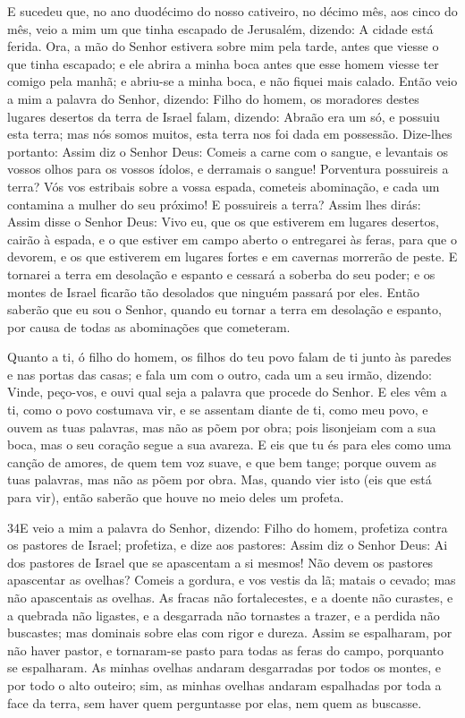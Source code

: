 E sucedeu que, no ano duodécimo do nosso cativeiro, no décimo
mês, aos cinco do mês, veio a mim um que tinha escapado de
Jerusalém, dizendo: A cidade está ferida. Ora, a mão do
Senhor estivera sobre mim pela tarde, antes que viesse o que tinha
escapado; e ele abrira a minha boca antes que esse homem viesse ter
comigo pela manhã; e abriu-se a minha boca, e não fiquei mais
calado. Então veio a mim a palavra do Senhor, dizendo:
Filho do homem, os moradores destes lugares desertos da terra
de Israel falam, dizendo: Abraão era um só, e possuiu esta terra;
mas nós somos muitos, esta terra nos foi dada em possessão.
Dize-lhes portanto: Assim diz o Senhor Deus: Comeis a carne
com o sangue, e levantais os vossos olhos para os vossos ídolos, e
derramais o sangue! Porventura possuireis a terra? Vós vos
estribais sobre a vossa espada, cometeis abominação, e cada um
contamina a mulher do seu próximo! E possuireis a terra?
Assim lhes dirás: Assim disse o Senhor Deus: Vivo eu, que os
que estiverem em lugares desertos, cairão à espada, e o que estiver
em campo aberto o entregarei às feras, para que o devorem, e os que
estiverem em lugares fortes e em cavernas morrerão de peste.
E tornarei a terra em desolação e espanto e cessará a soberba
do seu poder; e os montes de Israel ficarão tão desolados que
ninguém passará por eles. Então saberão que eu sou o Senhor,
quando eu tornar a terra em desolação e espanto, por causa de todas
as abominações que cometeram.

Quanto a ti, ó filho do homem, os filhos do teu povo falam de ti
junto às paredes e nas portas das casas; e fala um com o outro, cada
um a seu irmão, dizendo: Vinde, peço-vos, e ouvi qual seja a palavra
que procede do Senhor. E eles vêm a ti, como o povo costumava
vir, e se assentam diante de ti, como meu povo, e ouvem as tuas
palavras, mas não as põem por obra; pois lisonjeiam com a sua boca,
mas o seu coração segue a sua avareza. E eis que tu és para
eles como uma canção de amores, de quem tem voz suave, e que bem
tange; porque ouvem as tuas palavras, mas não as põem por obra.
Mas, quando vier isto (eis que está para vir), então saberão
que houve no meio deles um profeta.

\medskip

\lettrine{34} E veio a mim a palavra do Senhor, dizendo:
Filho do homem, profetiza contra os pastores de Israel;
profetiza, e dize aos pastores: Assim diz o Senhor Deus: Ai dos
pastores de Israel que se apascentam a si mesmos! Não devem os
pastores apascentar as ovelhas? Comeis a gordura, e vos vestis
da lã; matais o cevado; mas não apascentais as ovelhas. As
fracas não fortalecestes, e a doente não curastes, e a quebrada não
ligastes, e a desgarrada não tornastes a trazer, e a perdida não
buscastes; mas dominais sobre elas com rigor e dureza. Assim se
espalharam, por não haver pastor, e tornaram-se pasto para todas as
feras do campo, porquanto se espalharam. As minhas ovelhas
andaram desgarradas por todos os montes, e por todo o alto outeiro;
sim, as minhas ovelhas andaram espalhadas por toda a face da terra,
sem haver quem perguntasse por elas, nem quem as buscasse.

